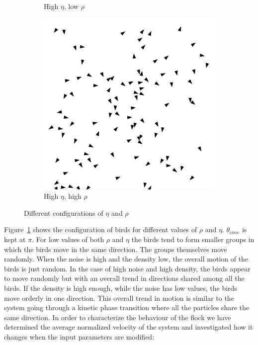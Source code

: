 \documentclass[twoside,twocolumn]{article}
\begin{document}
\begin{figure}[!htb]
\begin{subfigure}[b]{0.45\columnwidth}
            \caption{High $\eta$, low $\rho$}
        \end{subfigure}
        \begin{subfigure}[b]{0.45\columnwidth}
	    \includegraphics[width=\columnwidth]{high-eta-high-rho}
            \caption{High $\eta$, high $\rho$}
        \end{subfigure}
	\caption{Different configurations of $\eta$ and $\rho$}\label{fig:configs}
\end{figure}

Figure~\ref{fig:configs} shows the configuration of birds for different values of $\rho$ and $\eta$. $\theta_{cone}$ is kept at $\pi$.
For low values of both $\rho$ and $\eta$ the birds tend to form smaller groups in which the birds move in the same direction.
The groups themselves move randomly.
When the noise is high and the density low, the overall motion of the birds is just random.
In the case of high noise and high density, the birds appear to move randomly but with an overall trend in directions
shared among all the birds.
If the density is high enough, while the noise has low values, the birds move orderly in one direction.
This overall trend in motion is similar to the system going through a kinetic phase transition
where all the particles share the same direction. In order to characterize the behaviour of the flock
we have determined the average normalized velocity of the system and investigated how it changes when the input parameters are modified:
\end{document}
